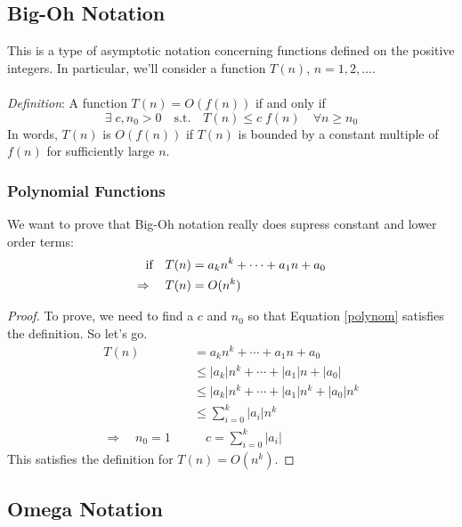 \documentclass[a4paper,12pt]{scrartcl}
\begin{document}
\subsection{Big-Oh Notation}

This is a type of asymptotic notation concerning functions
defined on the positive integers. In particular, 
we'll consider a function $T(n)$, $n=1,2,\ldots$.
\\
\\
{\sl Definition}: A function $T(n) = O(f(n))$ if
and only if
\begin{equation} 
    \exists \; c, n_0 >0 \quad \text{s.t.} \quad 
    T(n) \leq c \; f(n) \quad \forall n \geq n_0
\end{equation} 
In words, $T(n)$ is $O(f(n))$ if $T(n)$ is 
bounded by a constant multiple of $f(n)$ 
for sufficiently large $n$.

\subsubsection{Polynomial Functions}

We want to prove that Big-Oh notation really does
supress constant and lower order terms:
\begin{align}
    \text{if} \quad T(n) &= a_k n^k + \cdots + a_1 n + a_0 \notag\\
    \Rightarrow \quad T(n) &= O(n^k) \label{polynom}
\end{align}

\begin{proof} To prove, we need to find a $c$ and $n_0$
so that Equation \ref{polynom} satisfies the definition. 
So let's go.
\begin{align*}
    T(n) &= a_k n^k + \cdots + a_1 n + a_0 \\
    &\leq |a_k| n^k + \cdots + |a_1 | n + |a_0| \\
    &\leq |a_k| n^k + \cdots + |a_1 | n^k + |a_0|n^k \\
    &\leq \sum_{i=0}^k |a_i| n^k \\
    \Rightarrow \quad n_0=1 \quad & \quad c = \sum_{i=0}^k |a_i| 
\end{align*}
This satisfies the definition for $T(n)=O(n^k)$.
\end{proof}

\subsection{Omega Notation}
\end{document}

